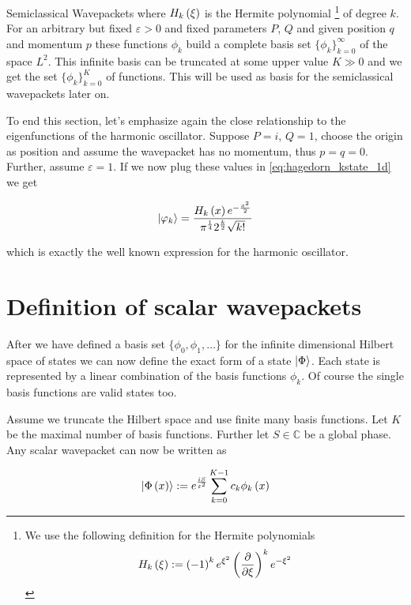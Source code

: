 \begin{chapter}{Semiclassical Wavepackets}
where $H_k\left( \xi \right)$ is the Hermite polynomial \footnote{
We use the following definition for the Hermite polynomials
\begin{equation}
  H_k\left( \xi \right) := \left(-1\right)^k e^{\xi^2} \left( \frac{\partial}{\partial\xi} \right)^k e^{-\xi^2}
\end{equation}}
of degree $k$. For an arbitrary but fixed $\varepsilon > 0$ and fixed parameters $P$,
$Q$ and given position $q$ and momentum $p$ these functions $\phi_k$ build a complete
basis set $\{\phi_k\}_{k=0}^\infty$ of the space $L^2$. This infinite basis can be
truncated at some upper value $K \gg 0$ and we get the set $\{\phi_k\}_{k=0}^K$
of functions. This will be used as basis for the semiclassical wavepackets later on.

To end this section, let's emphasize again the close relationship to the eigenfunctions
of the harmonic oscillator. Suppose $P=i$, $Q=1$, choose the origin as position and assume
the wavepacket has no momentum, thus $p=q=0$. Further, assume $\varepsilon = 1$.
If we now plug these values in \eqref{eq:hagedorn_kstate_1d} we get

\begin{equation}
  \Ket{\varphi_k} = \frac{H_k\left( x \right) e^{-\frac{x^2}{2}}}{\pi^{\frac{1}{4}}2^{\frac{k}{2}}\sqrt{k!}}
\end{equation}

which is exactly the well known expression for the harmonic oscillator.


\section{Definition of scalar wavepackets}

After we have defined a basis set $\{\phi_0, \phi_1, \ldots\}$ for the infinite
dimensional Hilbert space of states we can now define the exact form of a state
$\Ket{\Phi}$. Each state is represented by a linear combination of the basis
functions $\phi_k$. Of course the single basis functions are valid states too.

Assume we truncate the Hilbert space and use finite many basis functions. Let
$K$ be the maximal number of basis functions. Further let $S \in \mathbb{C}$ be
a global phase. Any scalar wavepacket can now be written as

\begin{equation} \label{eq:hawp_def_single}
  \Ket{\Phi\left( x \right)} := e^{\frac{iS}{\varepsilon^2}} \sum_{k=0}^{K-1} c_k \phi_k \left( x \right)
\end{equation}


\end{chapter}
